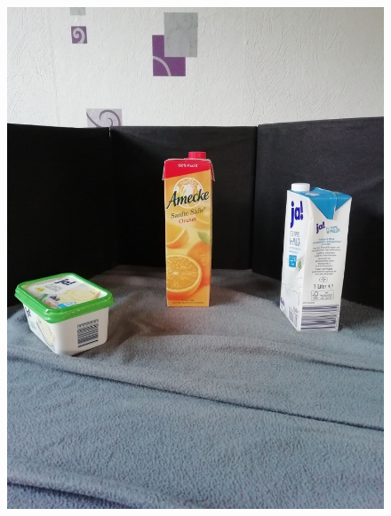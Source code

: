 \begin{figure}[htb]
\begin{minipage}[c]{0.2\textwidth}
\includegraphics[width=\textwidth]{Sources/Bild2.jpg}
\end{minipage}
\hfill
\begin{minipage}[c]{0.08\textwidth}

\end{minipage}
\end{figure}
